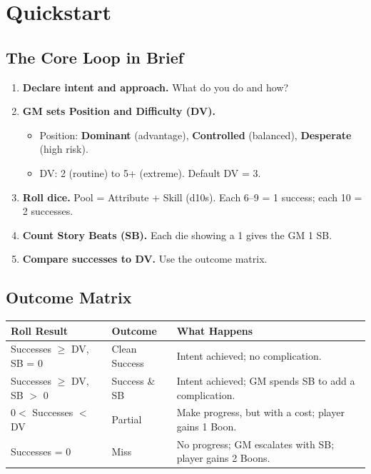 \section*{Quickstart}

\subsection*{The Core Loop in Brief}

\begin{enumerate}
  \item \textbf{Declare intent and approach.} What do you do and how?
  \item \textbf{GM sets Position and Difficulty (DV).}
  \begin{itemize}
    \item Position: \textbf{Dominant} (advantage), \textbf{Controlled} (balanced), \textbf{Desperate} (high risk).
    \item DV: 2 (routine) to 5+ (extreme). Default DV = 3.
  \end{itemize}
  \item \textbf{Roll dice.} Pool = Attribute + Skill (d10s). Each 6--9 = 1 success; each 10 = 2 successes.
  \item \textbf{Count Story Beats (SB).} Each die showing a 1 gives the GM 1 SB.
  \item \textbf{Compare successes to DV.} Use the outcome matrix.
\end{enumerate}

\subsection*{Outcome Matrix}

\begin{tabular}{@{}llp{6cm}@{}}
\toprule
\textbf{Roll Result} & \textbf{Outcome} & \textbf{What Happens} \\
\midrule
Successes $\ge$ DV, SB = 0 & Clean Success & Intent achieved; no complication. \\
Successes $\ge$ DV, SB $>$ 0 & Success \& SB & Intent achieved; GM spends SB to add a complication. \\
$0 <$ Successes $<$ DV & Partial & Make progress, but with a cost; player gains 1 Boon. \\
Successes = 0 & Miss & No progress; GM escalates with SB; player gains 2 Boons. \\
\bottomrule
\end{tabular}

